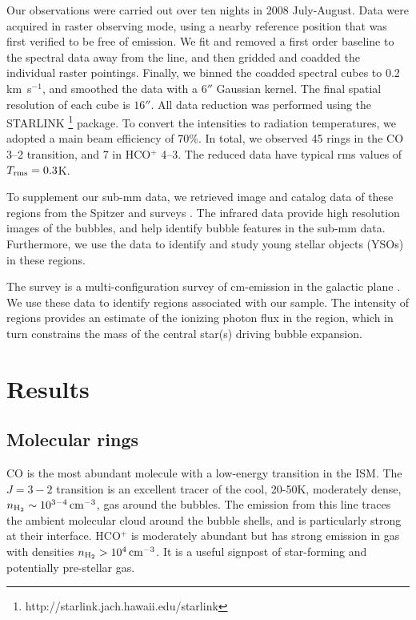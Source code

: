Our observations were carried out over ten nights in 2008 July-August.
Data were acquired in raster observing mode, using a nearby
reference position that was first verified to be free of emission.
We fit and removed a first order baseline to the spectral data away from the line, and then
gridded and coadded the individual raster pointings. Finally, we binned the coadded spectral
cubes to 0.2 km\, s$^{-1}$, and smoothed the data with a $6''$ Gaussian kernel. The final spatial resolution
of each cube is $16 ''$. All data reduction was performed using the STARLINK \footnote{http://starlink.jach.hawaii.edu/starlink}
package.
To convert the intensities to radiation temperatures, we adopted
a main beam efficiency of 70\%.
In total, we observed 45 rings in the CO 3--2 transition,
and 7 in HCO$^+$ 4--3. The reduced data have typical rms values of $T_{\rm rms} = 0.3 $K.

To supplement our sub-mm data, we retrieved image and catalog data of
these regions from the Spitzer \glimpse and  surveys \citep{Helfand06}. The infrared data provide high resolution images of the bubbles,
and help identify bubble features in the sub-mm data. Furthermore, we use the \glimpse data
to identify and study young stellar objects (YSOs) in these regions.

The  survey is a multi-configuration \vla
survey of cm-emission in the galactic plane \citep{Helfand06}. We use these data to
identify \hii regions associated with our sample. The intensity of \hii regions provides
an estimate of the ionizing photon flux in the region, which in turn constrains the mass of the central star(s)
driving bubble expansion.


\section {Results}
\label{sec:results}
\subsection {Molecular rings}

CO is the most abundant molecule with a low-energy transition
in the ISM. The $J=3-2$ transition is an excellent tracer of the
cool, 20-50K, moderately dense, $n_{\rm H_2}\sim 10^{3-4}\,{\rm cm}^{-3}$,
gas around the bubbles.  The emission from this line traces
the ambient molecular cloud around the bubble shells, and is particularly
strong at their interface.
HCO$^+$ is moderately abundant but has strong emission in
gas with densities $n_{\rm H_2}>10^4\,{\rm cm}^{-3}$.
It is a useful signpost of star-forming and potentially pre-stellar
gas.

